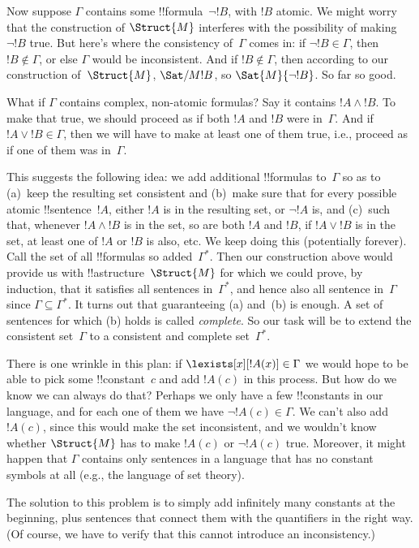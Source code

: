 Now suppose $\Gamma$ contains some !!{formula}~$\lnot !B$, with $!B$
atomic.  We might worry that the construction of
$\Struct{M}$ interferes with the possibility
of making $\lnot !B$ true.  But here's where the consistency
of~$\Gamma$ comes in: if $\lnot !B \in \Gamma$, then $!B \notin
\Gamma$, or else $\Gamma$ would be inconsistent.  And if $!B \notin
\Gamma$, then according to our construction
of~$\Struct{M}$,
$\Sat/{M}{!B}$, so
$\Sat{M}{\lnot !B}$.  So far so good.

What if $\Gamma$ contains complex, non-atomic formulas? Say it
contains $!A \land !B$. To make that true, we should proceed as if
both $!A$ and $!B$ were in~$\Gamma$.  And if $!A \lor !B \in \Gamma$,
then we will have to make at least one of them true, i.e., proceed as
if one of them was in~$\Gamma$.

This suggests the following idea: we add additional !!{formula}s
to~$\Gamma$ so as to (a)~keep the resulting set consistent and
(b)~make sure that for every possible atomic !!{sentence}~$!A$, either
$!A$ is in the resulting set, or $\lnot !A$ is, and (c)~such that,
whenever $!A \land !B$ is in the set, so are both $!A$ and $!B$, if
$!A \lor !B$ is in the set, at least one of $!A$ or $!B$ is also, etc.
We keep doing this (potentially forever).  Call the set of all
!!{formula}s so added~$\Gamma^*$.  Then our construction above would
provide us with !!a{structure}~$\Struct{M}$
for which we could prove, by induction, that it satisfies all sentences
in~$\Gamma^*$, and hence also all sentence in~$\Gamma$
since $\Gamma \subseteq \Gamma^*$.  It turns out that guaranteeing (a)
and~(b) is enough. A set of sentences for which (b) holds is called
\emph{complete}. So our task will be to extend the consistent
set~$\Gamma$ to a consistent and complete set~$\Gamma^*$.


There is one wrinkle in this plan: if $\lexists[x][!A(x)] \in \Gamma$
we would hope to be able to pick some !!{constant}~$c$ and add $!A(c)$
in this process.  But how do we know we can always do that?  Perhaps we
only have a few !!{constant}s in our language, and for each one of
them we have $\lnot !A(c) \in \Gamma$.  We can't also add $!A(c)$,
since this would make the set inconsistent, and we wouldn't know
whether $\Struct{M}$ has to make $!A(c)$ or $\lnot !A(c)$ true.
Moreover, it might happen that $\Gamma$ contains only sentences in a
language that has no constant symbols at all (e.g., the language of
set theory).

The solution to this problem is to simply add infinitely many
constants at the beginning, plus sentences that connect them with the
quantifiers in the right way.  (Of course, we have to verify that this
cannot introduce an inconsistency.)

